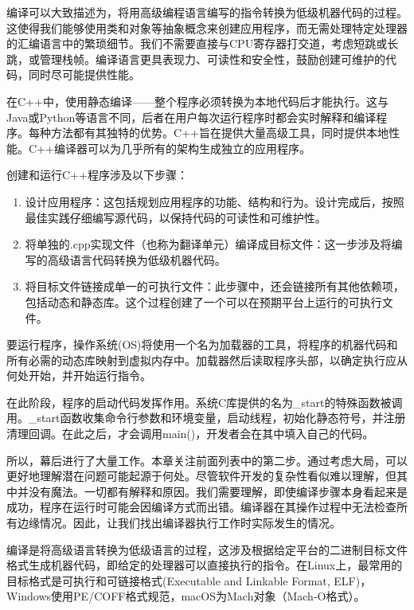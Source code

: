 
编译可以大致描述为，将用高级编程语言编写的指令转换为低级机器代码的过程。这使得我们能够使用类和对象等抽象概念来创建应用程序，而无需处理特定处理器的汇编语言中的繁琐细节。我们不需要直接与CPU寄存器打交道，考虑短跳或长跳，或管理栈帧。编译语言更具表现力、可读性和安全性，鼓励创建可维护的代码，同时尽可能提供性能。

在C++中，使用静态编译——整个程序必须转换为本地代码后才能执行。这与Java或Python等语言不同，后者在用户每次运行程序时都会实时解释和编译程序。每种方法都有其独特的优势。C++旨在提供大量高级工具，同时提供本地性能。C++编译器可以为几乎所有的架构生成独立的应用程序。

创建和运行C++程序涉及以下步骤：

\begin{enumerate}
\item
设计应用程序：这包括规划应用程序的功能、结构和行为。设计完成后，按照最佳实践仔细编写源代码，以保持代码的可读性和可维护性。

\item
将单独的.cpp实现文件（也称为翻译单元）编译成目标文件：这一步涉及将编写的高级语言代码转换为低级机器代码。

\item
将目标文件链接成单一的可执行文件：此步骤中，还会链接所有其他依赖项，包括动态和静态库。这个过程创建了一个可以在预期平台上运行的可执行文件。
\end{enumerate}

要运行程序，操作系统(OS)将使用一个名为加载器的工具，将程序的机器代码和所有必需的动态库映射到虚拟内存中。加载器然后读取程序头部，以确定执行应从何处开始，并开始运行指令。

在此阶段，程序的启动代码发挥作用。系统C库提供的名为\_start的特殊函数被调用。\_start函数收集命令行参数和环境变量，启动线程，初始化静态符号，并注册清理回调。在此之后，才会调用main()，开发者会在其中填入自己的代码。

所以，幕后进行了大量工作。本章关注前面列表中的第二步。通过考虑大局，可以更好地理解潜在问题可能起源于何处。尽管软件开发的复杂性看似难以理解，但其中并没有魔法。一切都有解释和原因。我们需要理解，即使编译步骤本身看起来是成功，程序在运行时可能会因编译方式而出错。编译器在其操作过程中无法检查所有边缘情况。因此，让我们找出编译器执行工作时实际发生的情况。


编译是将高级语言转换为低级语言的过程，这涉及根据给定平台的二进制目标文件格式生成机器代码，即给定的处理器可以直接执行的指令。在Linux上，最常用的目标格式是可执行和可链接格式(Executable and Linkable Format, ELF)，Windows使用PE/COFF格式规范，macOS为Mach对象（Mach-O格式）。

